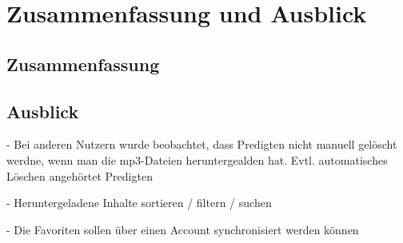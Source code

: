 \chapter{Zusammenfassung und Ausblick}
\label{Kap7}

\section{Zusammenfassung}

\section{Ausblick}
-  Bei anderen Nutzern wurde beobachtet, dass Predigten nicht manuell gelöscht werdne, wenn man die mp3-Dateien heruntergealden hat. Evtl. automatisches Löschen angehörtet Predigten

- Heruntergeladene Inhalte sortieren / filtern / suchen

- Die Favoriten sollen über einen Account synchronisiert werden können	
